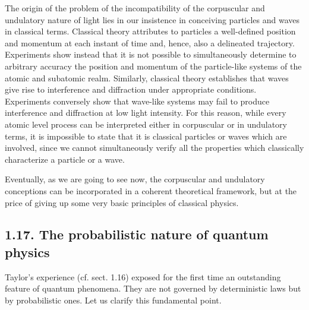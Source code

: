 \documentclass{article}
\begin{document}
The origin of the problem of the incompatibility of the corpuscular and undulatory nature of light lies in our insistence in conceiving particles and waves in classical terms. Classical theory attributes to particles a well-defined position and momentum at each instant of time and, hence, also a delineated trajectory. Experiments show instead that it is not possible to simultaneously determine to arbitrary accuracy the position and momentum of the particle-like systems of the atomic and subatomic realm. Similarly, classical theory establishes that waves give rise to interference and diffraction under appropriate conditions. Experiments conversely show that wave-like systems may fail to produce interference and diffraction at low light intensity. For this reason,
while every atomic level process can be interpreted either in corpuscular or in undulatory terms, it is impossible to state that it is classical particles or waves which are involved, since we cannot simultaneously verify all the properties which classically characterize a particle or a wave.

Eventually, as we are going to see now, the corpuscular and undulatory conceptions can be incorporated in a coherent theoretical framework, but at the price of giving up some very basic principles of classical physics.

\subsection*{1.17. The probabilistic nature of quantum physics}

Taylor's experience (cf. sect. 1.16) exposed for the first time an outstanding feature of quantum phenomena. They are not governed by deterministic laws but by probabilistic ones. Let us clarify this fundamental point.
\end{document}
